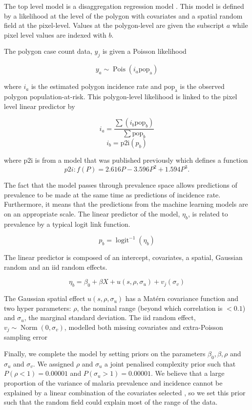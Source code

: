 \documentclass[11pt]{article}
\begin{document}
The top level model is a disaggregation regression model \cite{sturrock2014fine, wilson2017pointless, law2018variational, taylor2017continuous, li2012log}.
This model is defined by a likelihood at the level of the polygon with covariates and a spatial random field at the pixel-level. 
Values at the polygon-level are given the subscript $a$ while pixel level values are indexed with $b$.

The polygon case count data, $y_j$ is given a Poisson likelihood

$$y_a \sim \operatorname{Pois}(i_a\mathrm{pop_a})$$

where $i_a$ is the estimated polygon incidence rate and $\mathrm{pop_a}$ is the observed polygon population-at-risk. 
This polygon-level likelihood is linked to the pixel level linear predictor by 

$$i_a = \frac{ \sum(i_b \mathrm{pop}_b)}{\sum  \mathrm{pop}_b} $$
$$i_b = \mathrm{p2i}(p_b)$$

where $\mathrm{p2i}$ is from a model that was published previously \cite{cameron2015defining} which defines a function
$${p2i}: f\left(P\right) = 2.616P - 3.596P^2 + 1.594P^3.$$

The fact that the model passes through prevalence space allows predictions of prevalence to be made at the same time as predictions of incidence rate.
Furthermore, it means that the predictions from the machine learning models are on an appropriate scale.
The linear predictor of the model, $\eta_b$, is related to prevalence by a typical logit link function.

$$p_b = \operatorname{logit}^{-1}(\eta_b)$$

The linear predictor is composed of an intercept, covariates, a spatial, Gaussian random and an iid random effects.

$$\eta_b = \beta_0 + \beta X  + u(s, \rho, \sigma_u) + v_j(\sigma_v)$$

The Gaussian spatial effect $u(s, \rho, \sigma_u)$ has a Mat\'ern covariance function and two hyper parameters: $\rho$, the nominal range (beyond which correlation is $< 0.1$) and $\sigma_u$, the marginal standard deviation.
The iid random effect, $v_j \sim \operatorname{Norm}(0, \sigma_v)$, modelled both missing covariates and extra-Poisson sampling error

Finally, we complete the model by setting priors on the parameters $\beta_0, \beta, \rho$ and $\sigma_u$ and $\sigma_v$. We assigned $\rho$ and $\sigma_u$ a joint penalised complexity prior \cite{fuglstad2018constructing} such that $P(\rho < 1) = 0.00001$ and $P(\sigma_u > 1) = 0.00001$. 
We believe that a large proportion of the variance of malaria prevalence and incidence cannot be explained by a linear combination of the covariates selected \cite{bhatt2017improved}, so we set this prior such that the random field could explain most of the range of the data.
\end{document}
